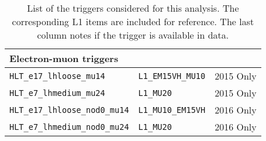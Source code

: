 \begin{table}[hbt]
\begin{center}
\begin{tabular}{|lll|}
\hline
\hline
\multicolumn{3}{|l|}{Electron-muon triggers} \\
\hline
\texttt{HLT\_e17\_lhloose\_mu14}              & \texttt{L1\_EM15VH\_MU10}    & 2015 Only \\
\texttt{HLT\_e7\_lhmedium\_mu24}              & \texttt{L1\_MU20}            & 2015 Only \\
\texttt{HLT\_e17\_lhloose\_nod0\_mu14}        & \texttt{L1\_MU10\_EM15VH}    & 2016 Only \\
\texttt{HLT\_e7\_lhmedium\_nod0\_mu24}        & \texttt{L1\_MU20}            & 2016 Only \\
\hline
\end{tabular}
\caption{
List of the triggers considered for this analysis. The corresponding L1 items are included for reference.  The last column notes if the trigger is available in data.
}
\label{tab:triggerlist}
\end{center}
\end{table}


